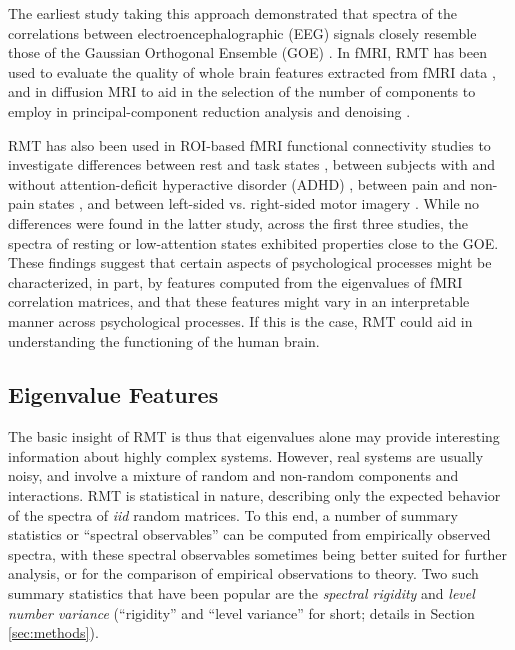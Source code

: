 \documentclass[12pt]{spieman}  %
\begin{document}
\begin{spacing}{2}
The earliest study taking this approach demonstrated that spectra of the
correlations between electroencephalographic (EEG) signals closely resemble
those of the Gaussian Orthogonal Ensemble (GOE)
\cite{sebaRandomMatrixAnalysis2003}. In fMRI, RMT has been used to evaluate the
quality of whole brain features extracted from fMRI data
\cite{voultsidouFeatureEvaluationFMRI2007, verganiRestingStateFMRI2019}, and in
diffusion MRI to aid in the selection of the number of components to employ in
principal-component reduction analysis and denoising
\cite{veraartDenoisingDiffusionMRI2016, verganiRestingStateFMRI2019,
ulfarssonDimensionEstimationNoisy2008}.

RMT has also been used in ROI-based fMRI functional connectivity studies to
investigate differences between rest and task states
\cite{wangSpectralPropertiesTemporal2015}, between subjects with and without
attention-deficit hyperactive disorder (ADHD)
\cite{wangRandomMatrixTheory2016}, between pain and non-pain states
\cite{matharooSpontaneousBackpainAlters2020}, and between left-sided vs.
right-sided motor imagery \cite{guRandomMatrixTheory2020}. While no differences
were found in the latter study, across the first three studies, the spectra of
resting or low-attention states exhibited properties close to the GOE. These
findings suggest that certain aspects of psychological processes might be
characterized, in part, by features computed from the eigenvalues of fMRI
correlation matrices, and that these features might vary in an interpretable
manner across psychological processes. If this is the case, RMT could aid in
understanding the functioning of the human brain.


\subsection{Eigenvalue Features}

The basic insight of RMT is thus that eigenvalues alone may provide
interesting information about highly complex systems. However, real systems are
usually noisy, and involve a mixture of random and non-random components and
interactions. RMT is statistical in nature, describing only the expected
behavior of the spectra of \textit{iid} random matrices. To this end, a number
of summary statistics or ``spectral observables''
\cite{mehtaRandomMatrices2004, guhrRandommatrixTheoriesQuantum1998a} can be
computed from empirically observed spectra, with these spectral observables
sometimes being better suited for further analysis, or for the comparison of
empirical observations to theory. Two such summary statistics that have been
popular\cite{santhanamStatisticsAtmosphericCorrelations2001,
jalanUncoveringRandomnessSuccess2014, matharooSpontaneousBackpainAlters2020,
bandyopadhyayUniversalityComplexNetworks2007,
agrawalQuantifyingRandomnessProtein2014, raiRandomnessPreservedPatterns2015,
sebaRandomMatrixAnalysis2003,wangSpectralPropertiesTemporal2015,
wangRandomMatrixTheory2016} are the \textit{spectral rigidity} and
\textit{level number variance} (``rigidity'' and ``level variance'' for short;
details in Section \ref{sec:methods}).


\end{spacing}
\end{document}
